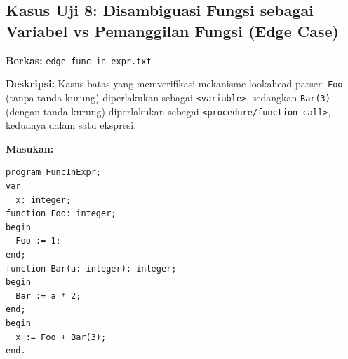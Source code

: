 \documentclass[12pt,a4paper]{article}
\begin{document}
\subsection{Kasus Uji 8: Disambiguasi Fungsi sebagai Variabel vs Pemanggilan Fungsi (Edge Case)}
\textbf{Berkas:} \texttt{edge\_func\_in\_expr.txt}

\textbf{Deskripsi:} Kasus batas yang memverifikasi mekanisme lookahead parser: \texttt{Foo} (tanpa tanda kurung) diperlakukan sebagai \texttt{<variable>}, sedangkan \texttt{Bar(3)} (dengan tanda kurung) diperlakukan sebagai \texttt{<procedure/function-call>}, keduanya dalam satu ekspresi.

\textbf{Masukan:}
\begin{lstlisting}[style=default]
program FuncInExpr;
var
  x: integer;
function Foo: integer;
begin
  Foo := 1;
end;
function Bar(a: integer): integer;
begin
  Bar := a * 2;
end;
begin
  x := Foo + Bar(3);
end.
\end{lstlisting}
\end{document}

